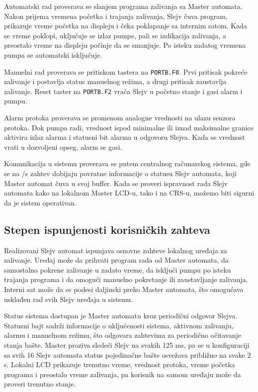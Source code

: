 \documentclass[12pt]{article}
\numberwithin{figure}{section}
\begin{document}
  Automatski rad proverava se slanjem programa zalivanja sa Master automata. 
  Nakon prijema vremena početka i trajanja zalivanja, Slejv čuva program, prikazuje vreme početka na displeju i čeka poklapanje sa internim satom. 
  Kada se vreme poklopi, uključuje se izlaz pumpe, pali se indikacija zalivanja, a preostalo vreme na displeju počinje da se smanjuje. 
  Po isteku zadatog vremena pumpa se automatski isključuje.

  Manuelni rad proverava se pritiskom tastera na \texttt{PORTB.F0}. 
  Prvi pritisak pokreće zalivanje i postavlja status manuelnog režima, a drugi pritisak zaustavlja zalivanje. 
  Reset taster na \texttt{PORTB.F2} vraća Slejv u početno stanje i gasi alarm i pumpu.

  Alarm protoka proverava se promenom analogne vrednosti na ulazu senzora protoka. 
  Dok pumpa radi, vrednost ispod minimalne ili iznad maksimalne granice aktivira izlaz alarma i statusni bit alarma u odgovoru Slejva. 
  Kada se vrednost vrati u dozvoljeni opseg, alarm se gasi.

  Komunikacija u sistemu proverava se putem centralnog računarskog sistema, gde se na /s zahtev dobijaju povratne informacije o statusu Slejv automata, koji Master automat čuva u svoj buffer.
  Kada se proveri ispravnost rada Slejv automata kako na lokalnom Master LCD-u, tako i na CRS-u, možemo biti sigurni da je sistem operativan.
  \subsection{Stepen ispunjenosti korisničkih zahteva}
  Realizovani Slejv automat ispunjava osnovne zahteve lokalnog uređaja za zalivanje. 
  Uređaj može da prihvati program rada od Master automata, da samostalno pokrene zalivanje u zadato vreme, da isključi pumpu po isteku trajanja programa i da omogući manuelno pokretanje ili zaustavljanje zalivanja. 
  Interni sat može da se podesi daljinski preko Master automata, što omogućava usklađen rad svih Slejv uređaja u sistemu.

  Status sistema dostupan je Master automatu kroz periodični odgovor Slejva. 
  Statusni bajt sadrži informacije o uključenosti sistema, aktivnom zalivanju, alarmu i manuelnom režimu, što odgovara zahtevima za periodično očitavanje stanja bašte. 
  Master proziva sledeći Slejv na svakih 125 ms, pa se u konfiguraciji sa svih 16 Slejv automata status pojedinačne bašte osvežava približno na svake 2 s.
  Lokalni LCD prikazuje trenutno vreme, vrednost protoka, vreme početka programa i preostalo vreme zalivanja, pa korisnik na samom uređaju može da proveri trenutno stanje.
\end{document}
